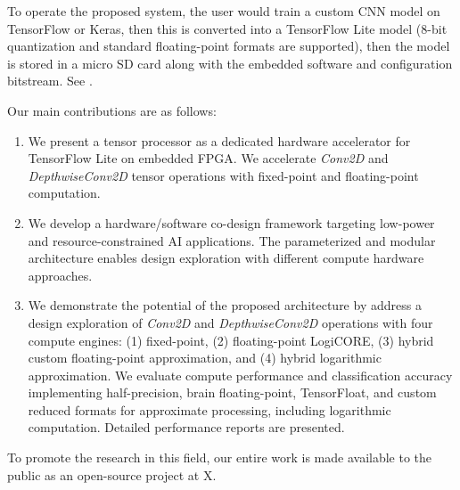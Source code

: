 To operate the proposed system, the user would train a custom CNN model on TensorFlow or Keras, then this is converted into a TensorFlow Lite model (8-bit quantization and standard floating-point formats are supported), then the model is stored in a micro SD card along with the embedded software and configuration bitstream. See .

Our main contributions are as follows:
\begin{enumerate}
	\item We present a tensor processor as a dedicated hardware accelerator for TensorFlow Lite on embedded FPGA. We accelerate \emph{Conv2D} and \emph{DepthwiseConv2D} tensor operations with fixed-point and floating-point computation.
	\item We develop a hardware/software co-design framework targeting low-power and resource-constrained AI applications. The parameterized and modular architecture enables design exploration with different compute hardware approaches.
	\item We demonstrate the potential of the proposed architecture by address a design exploration of \emph{Conv2D} and \emph{DepthwiseConv2D} operations with four compute engines: (1) fixed-point, (2) floating-point LogiCORE, (3) hybrid custom floating-point approximation, and (4) hybrid logarithmic approximation. We evaluate compute performance and classification accuracy implementing half-precision, brain floating-point, TensorFloat, and custom reduced formats for approximate processing, including logarithmic computation. Detailed performance reports are presented.
\end{enumerate}

To promote the research in this field, our entire work is made available to the public as an open-source project at X.